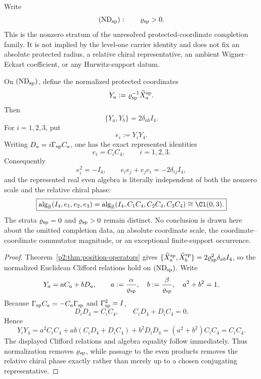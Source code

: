 \documentclass[12pt,a4paper]{article}
\begin{document}
\begin{definition}
\label{p2c:def:nondegenerate-protected-coordinate-stratum}
Write
\[
 (\mathrm{ND}_{\rm sp}):\qquad \varrho_{\rm sp}>0.
\]
This is the nonzero stratum of the unresolved protected-coordinate completion
family.  It is not implied by the level-one carrier identity and does not fix
an absolute protected radius, a relative chiral representative, an ambient
Wigner--Eckart coefficient, or any Hurwitz-support datum.
\end{definition}

\begin{corollary}
\label{p2c:cor:nondegenerate-protected-clifford-orbit}
On \((\mathrm{ND}_{\rm sp})\), define the normalized protected coordinates
\[
 Y_a:=\varrho_{\rm sp}^{-1}\widehat X_a^{\rm sp}.
\]
Then
\[
 \boxed{\{Y_a,Y_b\}=2\delta_{ab}I_4.}
\]
For \(i=1,2,3\), put
\[
 e_i:=Y_iY_4.
\]
Writing \(D_a=i\Gamma_{\rm sp}C_a\), one has the exact represented identities
\[
 \boxed{e_i=C_iC_4,\qquad i=1,2,3.}
\]
Consequently
\[
 e_i^2=-I_4,
 \qquad
 e_ie_j+e_je_i=-2\delta_{ij}I_4,
\]
and the represented real even algebra is literally independent of both the
nonzero scale and the relative chiral phase:
\[
 \boxed{\operatorname{alg}_{\mathbb R}(I_4,e_1,e_2,e_3)
 =\operatorname{alg}_{\mathbb R}(I_4,C_1C_4,C_2C_4,C_3C_4)
 \cong \Cl(0,3).}
\]
The strata \(\varrho_{\rm sp}=0\) and \(\varrho_{\rm sp}>0\) remain distinct.
No conclusion is drawn here about the omitted completion data, an absolute
coordinate scale, the coordinate--coordinate commutator magnitude, or an
exceptional finite-support occurrence.
\end{corollary}

\begin{proof}
Theorem~\ref{p2:thm:position-operators} gives
\(\{\widehat X_a^{\rm sp},\widehat X_b^{\rm sp}\}
=2\varrho_{\rm sp}^2\delta_{ab}I_4\), so the normalized Euclidean Clifford
relations hold on \((\mathrm{ND}_{\rm sp})\).  Write
\[
 Y_a=aC_a+bD_a,
 \qquad
 a:=\frac{\alpha}{\varrho_{\rm sp}},\quad
 b:=\frac{\beta}{\varrho_{\rm sp}},\quad
 a^2+b^2=1.
\]
Because \(\Gamma_{\rm sp}C_a=-C_a\Gamma_{\rm sp}\) and
\(\Gamma_{\rm sp}^2=I\),
\[
 D_iD_4=C_iC_4,
 \qquad
 C_iD_4+D_iC_4=0.
\]
Hence
\[
 Y_iY_4
 =a^2C_iC_4+ab(C_iD_4+D_iC_4)+b^2D_iD_4
 =(a^2+b^2)C_iC_4
 =C_iC_4.
\]
The displayed Clifford relations and algebra equality follow immediately.
Thus normalization removes \(\varrho_{\rm sp}\), while passage to the even
products removes the relative chiral phase exactly rather than merely up to a
chosen conjugating representative.
\end{proof}
\end{document}
